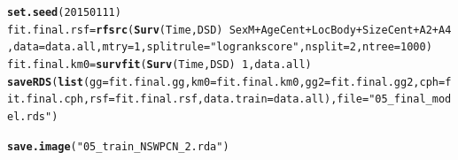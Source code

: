 \documentclass{article}\usepackage[]{graphicx}\usepackage[]{color}
\makeatletter
\newcommand{\hlnum}[1]{\textcolor[rgb]{0.686,0.059,0.569}{#1}}%
\newcommand{\hlstr}[1]{\textcolor[rgb]{0.192,0.494,0.8}{#1}}%
\newcommand{\hlopt}[1]{\textcolor[rgb]{0,0,0}{#1}}%
\newcommand{\hlstd}[1]{\textcolor[rgb]{0.345,0.345,0.345}{#1}}%
\newcommand{\hlkwb}[1]{\textcolor[rgb]{0.69,0.353,0.396}{#1}}%
\newcommand{\hlkwc}[1]{\textcolor[rgb]{0.333,0.667,0.333}{#1}}%
\newcommand{\hlkwd}[1]{\textcolor[rgb]{0.737,0.353,0.396}{\textbf{#1}}}%
\newenvironment{kframe}{%
 \def\at@end@of@kframe{}%
 \ifinner\ifhmode%
  \def\at@end@of@kframe{\end{minipage}}%
  \begin{minipage}{\columnwidth}%
 \fi\fi%
 \def\FrameCommand##1{\hskip\@totalleftmargin \hskip-\fboxsep
 \colorbox{shadecolor}{##1}\hskip-\fboxsep
     \hskip-\linewidth \hskip-\@totalleftmargin \hskip\columnwidth}%
 \MakeFramed {\advance\hsize-\width
   \@totalleftmargin\z@ \linewidth\hsize
   \@setminipage}}%
 {\par\unskip\endMakeFramed%
 \at@end@of@kframe}
\newenvironment{knitrout}{}{} %
\makeatother
\begin{document}
\begin{knitrout}
\begin{kframe}
\begin{alltt}
\hlkwd{set.seed}\hlstd{(}\hlnum{20150111}\hlstd{)}
\hlstd{fit.final.rsf} \hlkwb{=} \hlkwd{rfsrc}\hlstd{(}\hlkwd{Surv}\hlstd{(Time, DSD)} \hlopt{~} \hlstd{SexM} \hlopt{+} \hlstd{AgeCent} \hlopt{+} \hlstd{LocBody} \hlopt{+} \hlstd{SizeCent} \hlopt{+} \hlstd{A2} \hlopt{+} \hlstd{A4,} \hlkwc{data} \hlstd{= data.all,} \hlkwc{mtry} \hlstd{=} \hlnum{1}\hlstd{,} \hlkwc{splitrule} \hlstd{=} \hlstr{"logrankscore"}\hlstd{,} \hlkwc{nsplit} \hlstd{=} \hlnum{2}\hlstd{,} \hlkwc{ntree} \hlstd{=} \hlnum{1000}\hlstd{)}
\hlstd{fit.final.km0} \hlkwb{=} \hlkwd{survfit}\hlstd{(}\hlkwd{Surv}\hlstd{(Time, DSD)} \hlopt{~} \hlnum{1}\hlstd{, data.all)}
\hlkwd{saveRDS}\hlstd{(}\hlkwd{list}\hlstd{(}\hlkwc{gg} \hlstd{= fit.final.gg,} \hlkwc{km0} \hlstd{= fit.final.km0,} \hlkwc{gg2} \hlstd{= fit.final.gg2,} \hlkwc{cph} \hlstd{= fit.final.cph,} \hlkwc{rsf} \hlstd{= fit.final.rsf,} \hlkwc{data.train} \hlstd{= data.all),} \hlkwc{file} \hlstd{=} \hlstr{"05_final_model.rds"}\hlstd{)}
\end{alltt}
\end{kframe}
\end{knitrout}

\begin{knitrout}
\color{fgcolor}\begin{kframe}
\begin{alltt}
\hlkwd{save.image}\hlstd{(}\hlstr{"05_train_NSWPCN_2.rda"}\hlstd{)}
\end{alltt}
\end{kframe}
\end{knitrout}

\end{document}
